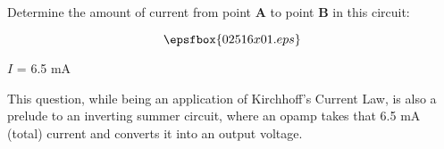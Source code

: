 

Determine the amount of current from point {\bf A} to point {\bf B} in this circuit:

$$\epsfbox{02516x01.eps}$$







$I$ = 6.5 mA







This question, while being an application of Kirchhoff's Current Law, is also a prelude to an inverting summer circuit, where an opamp takes that 6.5 mA (total) current and converts it into an output voltage.




